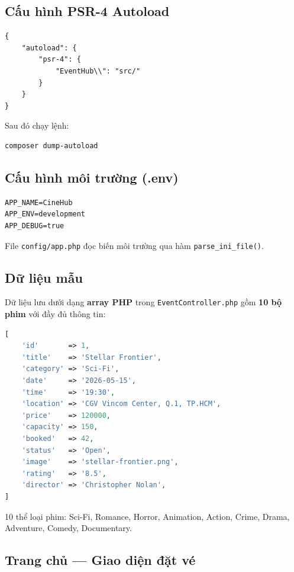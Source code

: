 \documentclass[12pt,a4paper]{article}
\begin{document}
\subsection{Cấu hình PSR-4 Autoload}

\begin{lstlisting}[caption={composer.json}]
{
    "autoload": {
        "psr-4": {
            "EventHub\\": "src/"
        }
    }
}
\end{lstlisting}

Sau đó chạy lệnh:
\begin{lstlisting}[language=bash]
composer dump-autoload
\end{lstlisting}

\subsection{Cấu hình môi trường (.env)}

\begin{lstlisting}[caption={.env}]
APP_NAME=CineHub
APP_ENV=development
APP_DEBUG=true
\end{lstlisting}

File \texttt{config/app.php} đọc biến môi trường qua hàm \texttt{parse\_ini\_file()}.

\subsection{Dữ liệu mẫu}

Dữ liệu lưu dưới dạng \textbf{array PHP} trong \texttt{EventController.php} gồm \textbf{10 bộ phim} với đầy đủ thông tin:

\begin{lstlisting}[language=PHP,caption={Ví dụ một bản ghi phim}]
[
    'id'       => 1,
    'title'    => 'Stellar Frontier',
    'category' => 'Sci-Fi',
    'date'     => '2026-05-15',
    'time'     => '19:30',
    'location' => 'CGV Vincom Center, Q.1, TP.HCM',
    'price'    => 120000,
    'capacity' => 150,
    'booked'   => 42,
    'status'   => 'Open',
    'image'    => 'stellar-frontier.png',
    'rating'   => '8.5',
    'director' => 'Christopher Nolan',
]
\end{lstlisting}

10 thể loại phim: Sci-Fi, Romance, Horror, Animation, Action, Crime, Drama, Adventure, Comedy, Documentary.

\subsection{Trang chủ — Giao diện đặt vé}
\end{document}
